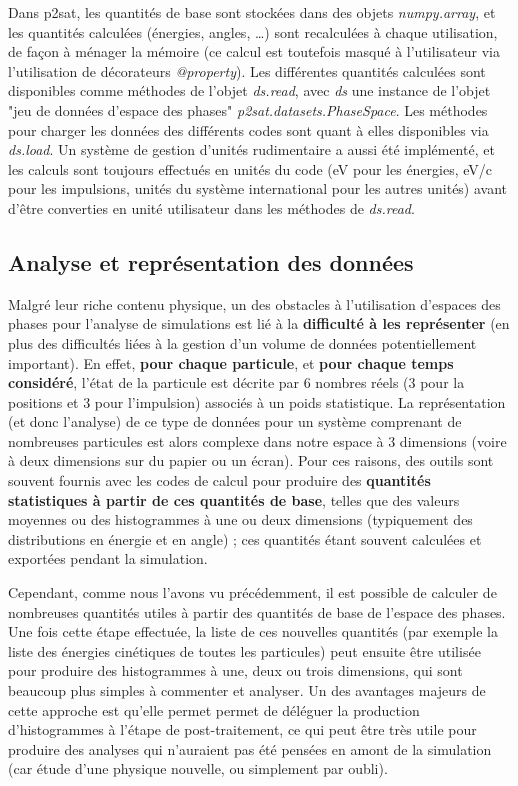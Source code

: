 \begin{refsection}
Dans p2sat, les quantités de base sont stockées dans des objets \textit{numpy.array}, et les quantités calculées (énergies, angles, …) sont recalculées à chaque utilisation, de façon à ménager la mémoire (ce calcul est toutefois masqué à l'utilisateur via l'utilisation de décorateurs \textit{@property}). Les différentes quantités calculées sont disponibles comme méthodes de l'objet \textit{ds.read}, avec \textit{ds} une instance de l'objet "jeu de données d'espace des phases" \textit{p2sat.datasets.PhaseSpace}. Les méthodes pour charger les données des différents codes sont quant à elles disponibles via \textit{ds.load}. Un système de gestion d'unités rudimentaire a aussi été implémenté, et les calculs sont toujours effectués en unités du code (eV pour les énergies, eV/c pour les impulsions, unités du système international pour les autres unités) avant d'être converties en unité utilisateur dans les méthodes de \textit{ds.read}. 

\subsection{Analyse et représentation des données}

Malgré leur riche contenu physique, un des obstacles à l'utilisation d'espaces des phases pour l'analyse de simulations est lié à la \textbf{difficulté à les représenter} (en plus des difficultés liées à la gestion d'un volume de données potentiellement important). En effet, \textbf{pour chaque particule}, et \textbf{pour chaque temps considéré}, l'état de la particule est décrite par 6 nombres réels (3 pour la positions et 3 pour l'impulsion) associés à un poids statistique. La représentation (et donc l'analyse) de ce type de données pour un système comprenant de nombreuses particules est alors complexe dans notre espace à 3 dimensions (voire à deux dimensions sur du papier ou un écran). Pour ces raisons, des outils sont souvent fournis avec les codes de calcul pour produire des \textbf{quantités statistiques à partir de ces quantités de base}, telles que des valeurs moyennes ou des histogrammes à une ou deux dimensions (typiquement des distributions en énergie et en angle) ; ces quantités étant souvent calculées et exportées pendant la simulation.

Cependant, comme nous l'avons vu précédemment, il est possible de calculer de nombreuses quantités utiles à partir des quantités de base de l'espace des phases. Une fois cette étape effectuée, la liste de ces nouvelles quantités (par exemple la liste des énergies cinétiques de toutes les particules) peut ensuite être utilisée pour produire des histogrammes à une, deux ou trois dimensions, qui sont beaucoup plus simples à commenter et analyser. Un des avantages majeurs de cette approche est qu'elle permet permet de déléguer la production d'histogrammes à l'étape de post-traitement, ce qui peut être très utile pour produire des analyses qui n'auraient pas été pensées en amont de la simulation (car étude d'une physique nouvelle, ou simplement par oubli).


\end{refsection}
